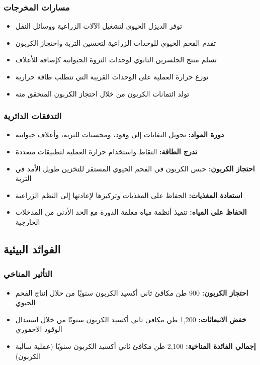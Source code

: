 \subsubsection{مسارات المخرجات}
\begin{itemize}
    \item توفر الديزل الحيوي لتشغيل الآلات الزراعية ووسائل النقل
    \item تقدم الفحم الحيوي للوحدات الزراعية لتحسين التربة واحتجاز الكربون
    \item تسلم منتج الجلسرين الثانوي لوحدات الثروة الحيوانية كإضافة للأعلاف
    \item توزع حرارة العملية على الوحدات القريبة التي تتطلب طاقة حرارية
    \item تولد ائتمانات الكربون من خلال احتجاز الكربون المتحقق منه
\end{itemize}

\subsubsection{التدفقات الدائرية}
\begin{itemize}
    \item \textbf{دورة المواد:} تحويل النفايات إلى وقود، ومحسنات للتربة، وأعلاف حيوانية
    \item \textbf{تدرج الطاقة:} التقاط واستخدام حرارة العملية لتطبيقات متعددة
    \item \textbf{احتجاز الكربون:} حبس الكربون في الفحم الحيوي المستقر للتخزين طويل الأمد في التربة
    \item \textbf{استعادة المغذيات:} الحفاظ على المغذيات وتركيزها لإعادتها إلى النظم الزراعية
    \item \textbf{الحفاظ على المياه:} تنفيذ أنظمة مياه مغلقة الدورة مع الحد الأدنى من المدخلات الخارجية
\end{itemize}

\subsection{الفوائد البيئية}

\subsubsection{التأثير المناخي}
\begin{itemize}
    \item \textbf{احتجاز الكربون:} 900 طن مكافئ ثاني أكسيد الكربون سنويًا من خلال إنتاج الفحم الحيوي
    \item \textbf{خفض الانبعاثات:} 1,200 طن مكافئ ثاني أكسيد الكربون سنويًا من خلال استبدال الوقود الأحفوري
    \item \textbf{إجمالي الفائدة المناخية:} 2,100 طن مكافئ ثاني أكسيد الكربون سنويًا (عملية سالبة الكربون)
\end{itemize}

